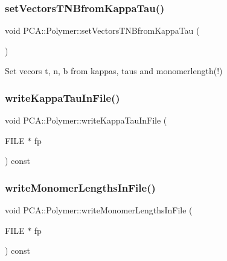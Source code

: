 \subsubsection{\texorpdfstring{set\+Vectors\+T\+N\+Bfrom\+Kappa\+Tau()}{setVectorsTNBfromKappaTau()}}
{\footnotesize\ttfamily void P\+C\+A\+::\+Polymer\+::set\+Vectors\+T\+N\+Bfrom\+Kappa\+Tau (\begin{DoxyParamCaption}{ }\end{DoxyParamCaption})}



Set vecors t, n, b from kappas, taus and monomerlength(!) 

\hypertarget{class_p_c_a_1_1_polymer_afa2a326cdf255a2311588e25842dcab5}{}\label{class_p_c_a_1_1_polymer_afa2a326cdf255a2311588e25842dcab5} 
\subsubsection{\texorpdfstring{write\+Kappa\+Tau\+In\+File()}{writeKappaTauInFile()}}
{\footnotesize\ttfamily void P\+C\+A\+::\+Polymer\+::write\+Kappa\+Tau\+In\+File (\begin{DoxyParamCaption}\item[{F\+I\+LE $\ast$}]{fp }\end{DoxyParamCaption}) const}

\hypertarget{class_p_c_a_1_1_polymer_a081b8e4d7cac0da6cc411c7b56ff7362}{}\label{class_p_c_a_1_1_polymer_a081b8e4d7cac0da6cc411c7b56ff7362} 
\subsubsection{\texorpdfstring{write\+Monomer\+Lengths\+In\+File()}{writeMonomerLengthsInFile()}}
{\footnotesize\ttfamily void P\+C\+A\+::\+Polymer\+::write\+Monomer\+Lengths\+In\+File (\begin{DoxyParamCaption}\item[{F\+I\+LE $\ast$}]{fp }\end{DoxyParamCaption}) const}

\hypertarget{class_p_c_a_1_1_polymer_a9859e587476da47e49cfee1152e93fa0}{}\label{class_p_c_a_1_1_polymer_a9859e587476da47e49cfee1152e93fa0} 
